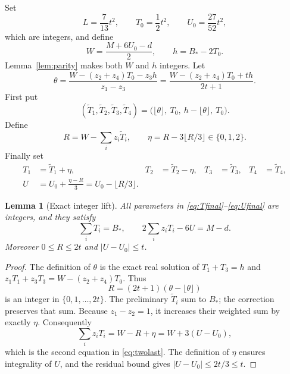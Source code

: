 \documentclass[11pt,a4paper]{article}
\newtheorem{lemma}[theorem]{Lemma}
\theoremstyle{definition}
\begin{document}
Set
\begin{equation}\label{eq:baseline}
 L=\frac7{13}t^2,\qquad T_0=\frac12t^2,\qquad
 U_0=\frac{27}{52}t^2,
\end{equation}
which are integers, and define
\begin{equation}\label{eq:W}
 W=\frac{M+6U_0-d}{2},\qquad h=B_*-2T_0.
\end{equation}
Lemma~\ref{lem:parity} makes both $W$ and $h$ integers. Let
\begin{equation}\label{eq:theta}
 \theta=\frac{W-(z_2+z_4)T_0-z_3h}{z_1-z_3}
       =\frac{W-(z_2+z_4)T_0+th}{2t+1}.
\end{equation}
First put
\begin{equation}\label{eq:Tpre}
 (\widetilde T_1,\widetilde T_2,\widetilde T_3,\widetilde T_4)
 =\bigl(\lfloor\theta\rfloor,\ T_0,\ h-\lfloor\theta\rfloor,\ T_0\bigr).
\end{equation}
Define
\begin{equation}\label{eq:R}
 R=W-\sum_i z_i\widetilde T_i,
 \qquad \eta=R-3\lfloor R/3\rfloor\in\{0,1,2\}.
\end{equation}
Finally set
\begin{align}
 T_1&=\widetilde T_1+\eta,&
 T_2&=\widetilde T_2-\eta,&
 T_3&=\widetilde T_3,&
 T_4&=\widetilde T_4,\label{eq:Tfinal}\\
 U&=U_0+\frac{\eta-R}{3}=U_0-\lfloor R/3\rfloor.\label{eq:Ufinal}
\end{align}

\begin{lemma}[Exact integer lift]\label{lem:lift}
All parameters in \eqref{eq:Tfinal}--\eqref{eq:Ufinal} are integers,
and they satisfy
\begin{equation}\label{eq:twolast}
 \sum_iT_i=B_*,\qquad 2\sum_i z_iT_i-6U=M-d.
\end{equation}
Moreover $0\le R\le2t$ and $|U-U_0|\le t$.
\end{lemma}
\begin{proof}
The definition of $\theta$ is the exact real solution of
$T_1+T_3=h$ and
$z_1T_1+z_3T_3=W-(z_2+z_4)T_0$.
Thus
\[
 R=(2t+1)(\theta-\lfloor\theta\rfloor)
\]
is an integer in $\{0,1,\ldots,2t\}$.
The preliminary $\widetilde T_i$ sum to $B_*$; the correction preserves
that sum. Because $z_1-z_2=1$, it increases their weighted sum by
exactly $\eta$. Consequently
\[
 \sum_i z_iT_i=W-R+\eta=W+3(U-U_0),
\]
which is the second equation in \eqref{eq:twolast}.
The definition of $\eta$ ensures integrality of $U$, and the residual
bound gives $|U-U_0|\le2t/3\le t$.
\end{proof}
\end{document}
